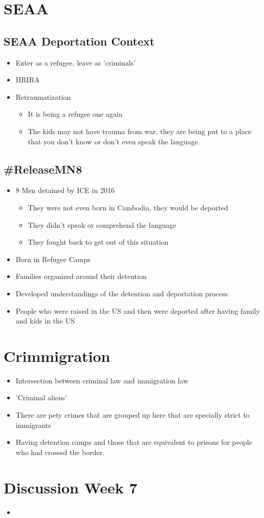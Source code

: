 \documentclass{article}
\begin{document}
\section{SEAA}

\subsection{SEAA Deportation Context}
\begin{itemize}
  \item Enter as a refugee, leave as 'criminals'
  \item IIRIRA
  \item Retraumatization
    \begin{itemize}
      \item It is being a refugee one again
      \item The kids may not have trauma from war, they
        are being put to a place that you don't know
        or don't even speak the language.
    \end{itemize}
\end{itemize}

\subsection{\#ReleaseMN8}
\begin{itemize}
  \item 8 Men detained by ICE in 2016
    \begin{itemize}
      \item They were not even born in Cambodia, they
        would be deported
      \item They didn't speak or comprehend the language
      \item They fought back to get out of this situation
    \end{itemize}
  \item Born in Refugee Camps
  \item Families organized around their detention
  \item Developed understandings of the detention and deportation process
  \item People who were raised in the US and then were deported
    after having family and kids in the US
\end{itemize}

\section{Crimmigration}
\begin{itemize}
  \item Intersection between criminal law and immigration law
  \item 'Criminal aliens'
  \item There are pety crimes that are grouped up here
    that are specially strict to immigrants
  \item Having detention camps and those that are equivalent to prisons
    for people who had crossed the border.
\end{itemize}

\section*{Discussion Week 7}
\begin{itemize}
  \item
\end{itemize}
\end{document}
